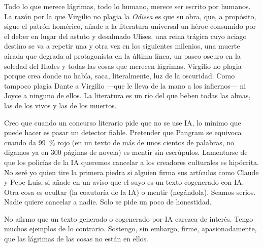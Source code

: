 \documentclass[11pt,a4paper]{article}
\begin{document}
Todo lo que merece lágrimas, todo lo humano, merece ser escrito por humanos. La razón por la que Virgilio no plagia la \emph{Odisea} es que su obra, que, a propósito, sigue el patrón homérico, añade a la literatura universal un héroe consumido por el deber en lugar del astuto y desalmado Ulises, una reina trágica cuyo aciago destino se va a repetir una y otra vez en los siguientes milenios, una muerte airada que degrada al protagonista en la última línea, un paseo oscuro en la soledad del Hades y todas las cosas que merecen lágrimas. Virgilio no plagia porque crea donde no había, saca, literalmente, luz de la oscuridad. Como tampoco plagia Dante a Virgilio ---que le lleva de la mano a los infiernos--- ni Joyce a ninguno de ellos. La literatura es un río del que beben todas las almas, las de los vivos y las de los muertos.

Creo que cuando un concurso literario pide que no se use IA, lo mínimo que puede hacer es pasar un detector fiable. Pretender que Pangram se equivoca cuando da 99~\% rojo (en un texto de más de unos cientos de palabras, no digamos ya en 300 páginas de novela) es mentir sin escrúpulos. Lamentarse de que los policías de la IA queremos cancelar a los creadores culturales es hipócrita. No seré yo quien tire la primera piedra si alguien firma sus artículos como Claude y Pepe Luis, si añade en un aviso que el suyo es un texto cogenerado con IA. Otra cosa es ocultar (la coautoría de la IA) o mentir (negándola). Seamos serios. Nadie quiere cancelar a nadie. Solo se pide un poco de honestidad.

No afirmo que un texto generado o cogenerado por IA carezca de interés. Tengo muchos ejemplos de lo contrario. Sostengo, sin embargo, firme, apasionadamente, que las lágrimas de las cosas no están en ellos.
\end{document}

